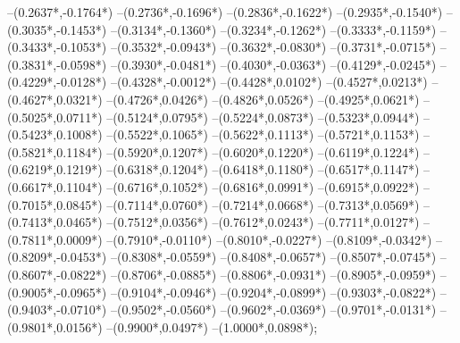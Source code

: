 {	--({0.2637*\xskala},{-0.1764*\yskala})
	--({0.2736*\xskala},{-0.1696*\yskala})
	--({0.2836*\xskala},{-0.1622*\yskala})
	--({0.2935*\xskala},{-0.1540*\yskala})
	--({0.3035*\xskala},{-0.1453*\yskala})
	--({0.3134*\xskala},{-0.1360*\yskala})
	--({0.3234*\xskala},{-0.1262*\yskala})
	--({0.3333*\xskala},{-0.1159*\yskala})
	--({0.3433*\xskala},{-0.1053*\yskala})
	--({0.3532*\xskala},{-0.0943*\yskala})
	--({0.3632*\xskala},{-0.0830*\yskala})
	--({0.3731*\xskala},{-0.0715*\yskala})
	--({0.3831*\xskala},{-0.0598*\yskala})
	--({0.3930*\xskala},{-0.0481*\yskala})
	--({0.4030*\xskala},{-0.0363*\yskala})
	--({0.4129*\xskala},{-0.0245*\yskala})
	--({0.4229*\xskala},{-0.0128*\yskala})
	--({0.4328*\xskala},{-0.0012*\yskala})
	--({0.4428*\xskala},{0.0102*\yskala})
	--({0.4527*\xskala},{0.0213*\yskala})
	--({0.4627*\xskala},{0.0321*\yskala})
	--({0.4726*\xskala},{0.0426*\yskala})
	--({0.4826*\xskala},{0.0526*\yskala})
	--({0.4925*\xskala},{0.0621*\yskala})
	--({0.5025*\xskala},{0.0711*\yskala})
	--({0.5124*\xskala},{0.0795*\yskala})
	--({0.5224*\xskala},{0.0873*\yskala})
	--({0.5323*\xskala},{0.0944*\yskala})
	--({0.5423*\xskala},{0.1008*\yskala})
	--({0.5522*\xskala},{0.1065*\yskala})
	--({0.5622*\xskala},{0.1113*\yskala})
	--({0.5721*\xskala},{0.1153*\yskala})
	--({0.5821*\xskala},{0.1184*\yskala})
	--({0.5920*\xskala},{0.1207*\yskala})
	--({0.6020*\xskala},{0.1220*\yskala})
	--({0.6119*\xskala},{0.1224*\yskala})
	--({0.6219*\xskala},{0.1219*\yskala})
	--({0.6318*\xskala},{0.1204*\yskala})
	--({0.6418*\xskala},{0.1180*\yskala})
	--({0.6517*\xskala},{0.1147*\yskala})
	--({0.6617*\xskala},{0.1104*\yskala})
	--({0.6716*\xskala},{0.1052*\yskala})
	--({0.6816*\xskala},{0.0991*\yskala})
	--({0.6915*\xskala},{0.0922*\yskala})
	--({0.7015*\xskala},{0.0845*\yskala})
	--({0.7114*\xskala},{0.0760*\yskala})
	--({0.7214*\xskala},{0.0668*\yskala})
	--({0.7313*\xskala},{0.0569*\yskala})
	--({0.7413*\xskala},{0.0465*\yskala})
	--({0.7512*\xskala},{0.0356*\yskala})
	--({0.7612*\xskala},{0.0243*\yskala})
	--({0.7711*\xskala},{0.0127*\yskala})
	--({0.7811*\xskala},{0.0009*\yskala})
	--({0.7910*\xskala},{-0.0110*\yskala})
	--({0.8010*\xskala},{-0.0227*\yskala})
	--({0.8109*\xskala},{-0.0342*\yskala})
	--({0.8209*\xskala},{-0.0453*\yskala})
	--({0.8308*\xskala},{-0.0559*\yskala})
	--({0.8408*\xskala},{-0.0657*\yskala})
	--({0.8507*\xskala},{-0.0745*\yskala})
	--({0.8607*\xskala},{-0.0822*\yskala})
	--({0.8706*\xskala},{-0.0885*\yskala})
	--({0.8806*\xskala},{-0.0931*\yskala})
	--({0.8905*\xskala},{-0.0959*\yskala})
	--({0.9005*\xskala},{-0.0965*\yskala})
	--({0.9104*\xskala},{-0.0946*\yskala})
	--({0.9204*\xskala},{-0.0899*\yskala})
	--({0.9303*\xskala},{-0.0822*\yskala})
	--({0.9403*\xskala},{-0.0710*\yskala})
	--({0.9502*\xskala},{-0.0560*\yskala})
	--({0.9602*\xskala},{-0.0369*\yskala})
	--({0.9701*\xskala},{-0.0131*\yskala})
	--({0.9801*\xskala},{0.0156*\yskala})
	--({0.9900*\xskala},{0.0497*\yskala})
	--({1.0000*\xskala},{0.0898*\yskala});
}
